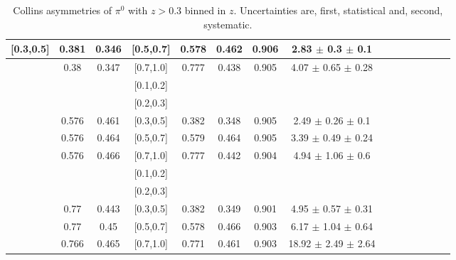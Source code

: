 \begin{table}[H]
\begin{tabular}{|c| c| c| c| c| c| c| c| c| c|c| c| c| c| c|}
[0.3,0.5]	&	0.381	&	0.346	&	[0.5,0.7]	&	0.578	&	0.462	&	0.906	& 2.83  $\pm$ 0.3  $\pm$ 0.1    	\\ \hline
[0.3,0.5]	&	0.38	&	0.347	&	[0.7,1.0]	&	0.777	&	0.438	&	0.905	& 4.07  $\pm$ 0.65  $\pm$ 0.28  	\\ \hline
\hline
[0.5,0.7]	&		&		&	[0.1,0.2]	&		&		&		&							\\ \hline
[0.5,0.7]	&		&		&	[0.2,0.3]	&		&		&		&							\\ \hline
[0.5,0.7]	&	0.576	&	0.461	&	[0.3,0.5]	&	0.382	&	0.348	&	0.905	&2.49  $\pm$ 0.26  $\pm$ 0.1  	\\ \hline
[0.5,0.7]	&	0.576	&	0.464	&	[0.5,0.7]	&	0.579	&	0.464	&	0.905	&3.39  $\pm$ 0.49  $\pm$ 0.24 	\\ \hline
[0.5,0.7]	&	0.576	&	0.466	&	[0.7,1.0]	&	0.777	&	0.442	&	0.904	&4.94  $\pm$ 1.06  $\pm$ 0.6  	\\ \hline
\hline
[0.7,1.0]	&		&		&	[0.1,0.2]	&		&		&		&							\\ \hline
[0.7,1.0]	&		&		&	[0.2,0.3]	&		&		&		&							\\ \hline
[0.7,1.0]	&	0.77	&	0.443	&	[0.3,0.5]	&	0.382	&	0.349	&	0.901	&4.95  $\pm$ 0.57  $\pm$ 0.31 	\\ \hline
[0.7,1.0]	&	0.77	&	0.45	&	[0.5,0.7]	&	0.578	&	0.466	&	0.903	&6.17  $\pm$ 1.04  $\pm$ 0.64 	\\ \hline
[0.7,1.0]	&	0.766	&	0.465	&	[0.7,1.0]	&	0.771	&	0.461	&	0.903	&18.92  $\pm$ 2.49  $\pm$ 2.64	\\ \hline
\end{tabular}
\caption[Collins asymmetries of $\pi^0$ with $z>0.3$ binned in $z$]{Collins asymmetries of $\pi^0$ with $z>0.3$ binned in $z$. Uncertainties are, first, statistical and, second, systematic.}
\label{tab:finaletazbin2}
\end{table}

